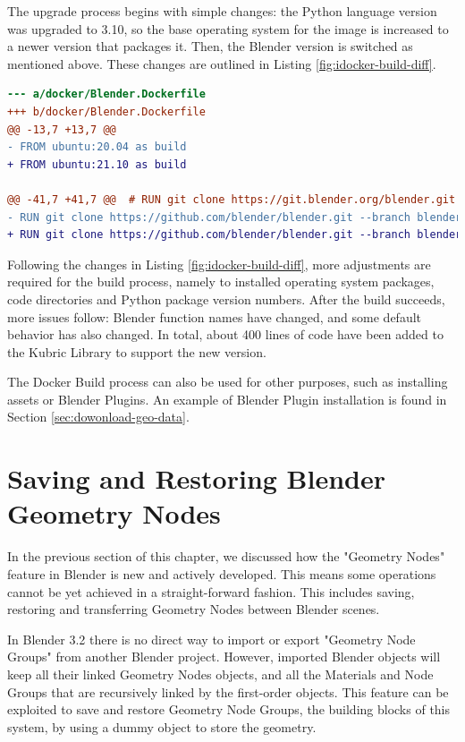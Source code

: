 The upgrade process begins with simple changes: the Python language version was upgraded to 3.10, so the base operating system for the image is increased to a newer version that packages it. Then, the Blender version is switched as mentioned above. These changes are outlined in Listing \ref{fig:idocker-build-diff}.


\begin{lstlisting}[language=diff,caption={Start of the Blender Version Upgrade},label={fig:idocker-build-diff}]
--- a/docker/Blender.Dockerfile
+++ b/docker/Blender.Dockerfile
@@ -13,7 +13,7 @@
- FROM ubuntu:20.04 as build
+ FROM ubuntu:21.10 as build

@@ -41,7 +41,7 @@  # RUN git clone https://git.blender.org/blender.git
- RUN git clone https://github.com/blender/blender.git --branch blender-v2.93-release --depth 1
+ RUN git clone https://github.com/blender/blender.git --branch blender-v3.2-release --depth 1 blender
\end{lstlisting}


Following the changes in Listing \ref{fig:idocker-build-diff}, more adjustments are required for the build process, namely to installed operating system packages, code directories and Python package version numbers. After the build succeeds, more issues follow: Blender function names have changed, and some default behavior has also changed. In total, about 400 lines of code have been added to the Kubric Library to support the new version.

The Docker Build process can also be used for other purposes, such as installing assets or Blender Plugins. An example of Blender Plugin installation is found in Section \ref{sec:dowonload-geo-data}.


\section{Saving and Restoring Blender Geometry Nodes}
\label{sec:save-restore-blender-geometry}

In the previous section of this chapter, we discussed how the "Geometry Nodes" feature in Blender is new and actively developed. This means some operations cannot be yet achieved in a straight-forward fashion. This includes saving, restoring and transferring Geometry Nodes between Blender scenes.

In Blender 3.2 there is no direct way to import or export "Geometry Node Groups" from another Blender project. However, imported Blender objects will keep all their linked Geometry Nodes objects, and all the Materials and Node Groups that are recursively linked by the first-order objects. This feature can be exploited to save and restore Geometry Node Groups, the building blocks of this system, by using a dummy object to store the geometry.

